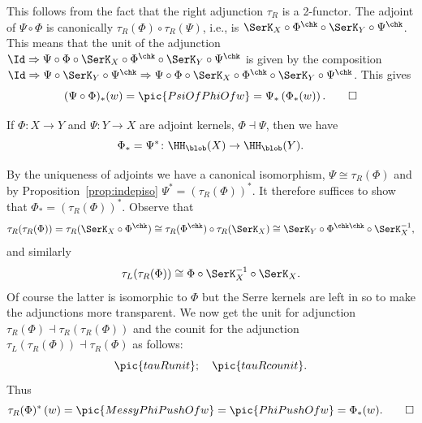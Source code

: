 \begin{Proof}
  This follows from the fact that the right adjunction $\tau_R$ is a
  2-functor.  The adjoint of $\Psi\circ\Phi$ is canonically
  $\tau_R(\Phi)\circ\tau_R(\Psi)$, i.e., is
  $\SerK_X\circ\Phi^\chk\circ\SerK_Y\circ\Psi^\chk$.  This means that
  the unit of the adjunction $\Id\Rightarrow
  \Psi\circ\Phi\circ\SerK_X\circ\Phi^\chk\circ\SerK_Y\circ\Psi^\chk$
  is given by the composition
  $\Id\Rightarrow\Psi\circ\SerK_Y\circ\Psi^\chk\Rightarrow
  \Psi\circ\Phi\circ\SerK_X\circ\Phi^\chk\circ\SerK_Y\circ\Psi^\chk$.
  This gives
  \[(\Psi\circ\Phi)_*(w)=\pic{PsiOfPhiOfw}=\Psi_*\left(\Phi_*(w)\right).
  \qedhere
  \]
\end{Proof}

\begin{Theorem}
\label{thm:adjadj}
  If $\Phi\colon X\to Y$ and $\Psi\colon Y\to X$ are adjoint kernels,
  $\Phi\dashv\Psi$, then we have
  \[\Phi_*=\Psi^*\colon \HH_\blob(X)\to\HH_\blob(Y).\]
\end{Theorem}

\begin{Proof}
  By the uniqueness of adjoints we have a canonical isomorphism,
  $\Psi\cong\tau_R(\Phi)$ and by Proposition~\ref{prop:indepiso}
  $\Psi^*=(\tau_R(\Phi))^*$.  It therefore suffices to show that
  $\Phi_*=(\tau_R(\Phi))^*$.  Observe that
  \[\tau_R(\tau_R(\Phi))=\tau_R(\SerK_X\circ\Phi^\chk)\cong
  \tau_R(\Phi^\chk)\circ
  \tau_R(\SerK_X)\cong\SerK_Y\circ\Phi^{\chk\chk}\circ \SerK_X^{-1},\]
  and similarly
 \[\tau_L(\tau_R(\Phi))\cong
 \Phi\circ\SerK_X^{-1}\circ \SerK_X.\] Of course the latter is
 isomorphic to $\Phi$ but the Serre kernels are left in so to make the
 adjunctions more transparent.  We now get the unit for adjunction
 $\tau_R(\Phi)\dashv\tau_R(\tau_R(\Phi))$ and the counit for the
 adjunction $\tau_L(\tau_R(\Phi))\dashv\tau_R(\Phi)$ as follows:
 \[\pic{tauRunit};\quad\pic{tauRcounit}.\]
 Thus
 \[\tau_R(\Phi)^*\left(w\right)
 =\pic{MessyPhiPushOfw}= \pic{PhiPushOfw}=\Phi_*(w). \qedhere\]
\end{Proof}
